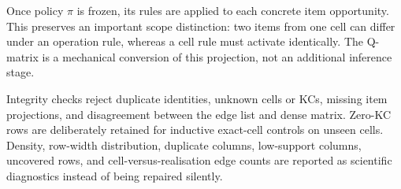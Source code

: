 Once policy $\pi$ is frozen, its rules are applied to each concrete item
opportunity.  This preserves an important scope distinction: two items from
one cell can differ under an operation rule, whereas a cell rule must activate
identically.  The Q-matrix is a mechanical conversion of this projection, not
an additional inference stage.

Integrity checks reject duplicate identities, unknown cells or KCs, missing
item projections, and disagreement between the edge list and dense matrix.
Zero-KC rows are deliberately retained for inductive exact-cell controls on
unseen cells.  Density, row-width distribution, duplicate columns, low-support
columns, uncovered rows, and cell-versus-realisation edge counts are reported
as scientific diagnostics instead of being repaired silently.
